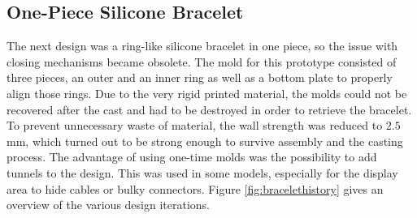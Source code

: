 \subsection{One-Piece Silicone Bracelet}
\label{sec:silicone-prototypes}
The next design was a ring-like silicone bracelet in one piece, so the issue with closing mechanisms became obsolete. The mold for this prototype consisted of three pieces, an outer and an inner ring as well as a bottom plate to properly align those rings. Due to the very rigid printed material, the molds could not be recovered after the cast and had to be destroyed in order to retrieve the bracelet. To prevent unnecessary waste of material, the wall strength was reduced to $2.5$ mm, which turned out to be strong enough to survive assembly and the casting process. The advantage of using one-time molds was the possibility to add tunnels to the design. This was used in some models, especially for the display area to hide cables or bulky connectors. Figure \ref{fig:bracelethistory} gives an overview of the various design iterations.


